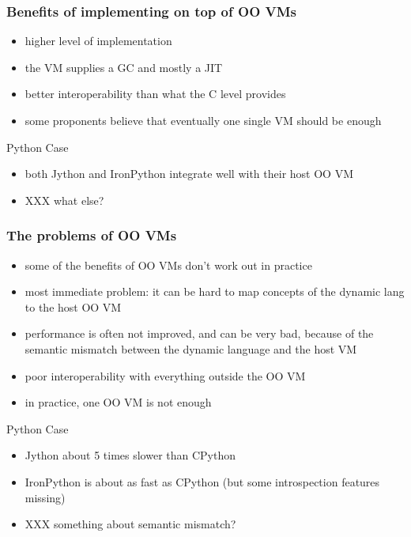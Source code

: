 \documentclass[utf8x]{beamer}
\begin{document}
\begin{frame}
  \frametitle{Benefits of implementing on top of OO VMs}
  \begin{itemize}
  \item
    higher level of implementation
  \item
    the VM supplies a GC and mostly a JIT
  \item
    better interoperability than what the C level provides
  \item
    some proponents believe that eventually one single VM should be enough
  \end{itemize}
  \pause
  \begin{block}{
    Python Case}
    \begin{itemize}
    \item
      both Jython and IronPython integrate well with their host OO VM
    \item
      XXX what else?
    \end{itemize}
  \end{block}
\end{frame}

\begin{frame}
  \frametitle{The problems of OO VMs}
  \begin{itemize}
  \item
    some of the benefits of OO VMs don't work out in practice
  \item
    most immediate problem: it can be hard to map
    concepts of the dynamic lang to
    the host OO VM
  \item
    performance is often not improved, and can be very bad, because of the
    semantic mismatch between the dynamic language and the host VM
  \item
    poor interoperability with everything outside the OO VM
  \item
    in practice, one OO VM is not enough
  \end{itemize}
  \pause
  \begin{block}{
    Python Case}
    \begin{itemize}
    \item
      Jython about 5 times slower than CPython
    \item
      IronPython is about as fast as CPython (but some introspection features
      missing)
    \item
      XXX something about semantic mismatch?
    \end{itemize}
  \end{block}
 
\end{frame}
\end{document}
